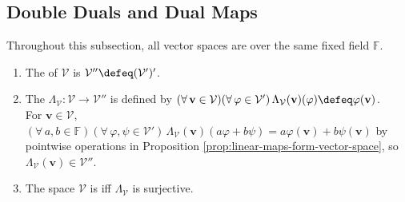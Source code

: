 \subsection{Double Duals and Dual Maps}
Throughout this subsection, all vector spaces are over the same fixed field $\mathbb{F}$.

\begin{definition} \label{def:algebraic-double-dual-and-natural-map} 
\begin{enumerate}[label=(\roman*)]
\setlength{\itemsep}{0pt}
\item The  of $\mathcal{V}$ is $\mathcal{V}''\defeq(\mathcal{V}')'$.
\item The  $\Lambda_{\mathcal{V}}:\mathcal{V}\to\mathcal{V}''$ is defined by $(\forall\,\mathbf{v}\in\mathcal{V})(\forall\,\varphi\in\mathcal{V}')\,\Lambda_{\mathcal{V}}(\mathbf{v})(\varphi)\defeq\varphi(\mathbf{v})$.\\
For $\mathbf{v}\in\mathcal{V}$, $(\forall\,a,b\in\mathbb{F})(\forall\,\varphi,\psi\in\mathcal{V}')\,\Lambda_{\mathcal{V}}(\mathbf{v})(a\varphi+b\psi)=a\varphi(\mathbf{v})+b\psi(\mathbf{v})$ by pointwise operations in Proposition \ref{prop:linear-maps-form-vector-space}, so $\Lambda_{\mathcal{V}}(\mathbf{v})\in\mathcal{V}''$.
\item The space $\mathcal{V}$ is  iff $\Lambda_{\mathcal{V}}$ is surjective.
\end{enumerate}
\end{definition}

